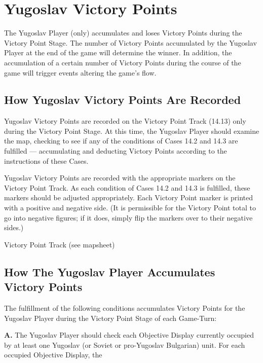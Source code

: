 \section{Yugoslav Victory Points}\label{sec:14.0}


\begin{generalrule}
The Yugoslav Player (only) accumulates and loses Victory Points during the Victory Point Stage. The number of Victory Points accumulated by the Yugoslav Player at the end of the game will determine the winner. In addition, the accumulation of a certain number of Victory Points during the course of the game will trigger events altering the game’s flow.
\end{generalrule}

\subsection{How Yugoslav Victory Points Are Recorded}\label{sec:14.1}

 Yugoslav Victory Points are recorded on the Victory Point Track (14.13) only during the Victory Point Stage. At this time, the Yugoslav Player should examine the map, checking to see if any of the conditions of Cases 14.2 and 14.3 are fulfilled — accumulating and deducting Victory Points according to the instructions of these Cases.

 Yugoslav Victory Points are recorded with the appropriate markers on the Victory Point Track. As each condition of Cases 14.2 and 14.3 is fulfilled, these markers should be adjusted appropriately. Each Victory Point marker is printed with a positive and negative side. (It is permissible for the Victory Point total to go into negative figures; if it does, simply flip the markers over to their negative sides.)

 Victory Point Track (see mapsheet)

\subsection{How The Yugoslav Player Accumulates Victory Points}\label{sec:14.2}

The fulfillment of the following conditions accumulates Victory Points for the Yugoslav Player during the Victory Point Stage of each Game-Turn:

\textbf{A.} The Yugoslav Player should check each Objective Display currently occupied by at least one Yugoslav (or Soviet or pro-Yugoslav Bulgarian) unit. For each occupied Objective Display, the

